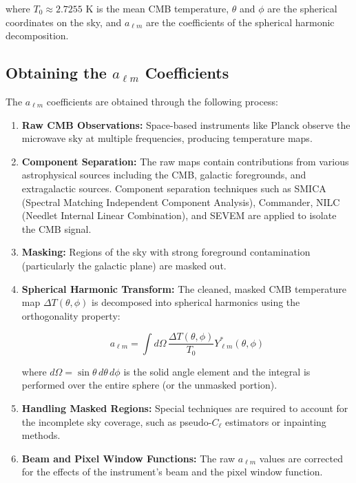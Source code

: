 \documentclass[11pt]{article}
\begin{document}
where $T_0 \approx 2.7255$ K is the mean CMB temperature, $\theta$ and $\phi$ are the spherical coordinates on the sky, and $a_{\ell m}$ are the coefficients of the spherical harmonic decomposition.

\subsection{Obtaining the $a_{\ell m}$ Coefficients}

The $a_{\ell m}$ coefficients are obtained through the following process:

\begin{enumerate}
    \item \textbf{Raw CMB Observations:} Space-based instruments like Planck observe the microwave sky at multiple frequencies, producing temperature maps.
    
    \item \textbf{Component Separation:} The raw maps contain contributions from various astrophysical sources including the CMB, galactic foregrounds, and extragalactic sources. Component separation techniques such as SMICA (Spectral Matching Independent Component Analysis), Commander, NILC (Needlet Internal Linear Combination), and SEVEM are applied to isolate the CMB signal.
    
    \item \textbf{Masking:} Regions of the sky with strong foreground contamination (particularly the galactic plane) are masked out.
    
    \item \textbf{Spherical Harmonic Transform:} The cleaned, masked CMB temperature map $\Delta T(\theta, \phi)$ is decomposed into spherical harmonics using the orthogonality property:
    
    \begin{equation}
    a_{\ell m} = \int d\Omega \, \frac{\Delta T(\theta, \phi)}{T_0} Y_{\ell m}^*(\theta, \phi)
    \end{equation}
    
    where $d\Omega = \sin\theta \, d\theta \, d\phi$ is the solid angle element and the integral is performed over the entire sphere (or the unmasked portion).
    
    \item \textbf{Handling Masked Regions:} Special techniques are required to account for the incomplete sky coverage, such as pseudo-$C_\ell$ estimators or inpainting methods.
    
    \item \textbf{Beam and Pixel Window Functions:} The raw $a_{\ell m}$ values are corrected for the effects of the instrument's beam and the pixel window function.
\end{enumerate}
\end{document}
